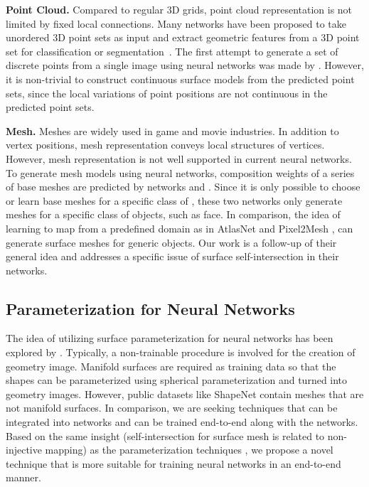 \noindent\textbf{Point Cloud.}
Compared to regular 3D grids, point cloud representation is not limited by fixed local connections.
Many networks have been proposed to take unordered 3D point sets as input and extract geometric features from a 3D point set for classification or segmentation~\cite{pointnet,NIPS2017_7095,pointcnn}.
%
The first attempt to generate a set of discrete points from a single image using neural networks was made by \cite{PSGN}. However, it is non-trivial to construct continuous surface models from the predicted point sets, since the local variations of point positions are not continuous in the predicted point sets.

\noindent\textbf{Mesh.}
Meshes are widely used in game and movie industries.
In addition to vertex positions, mesh representation conveys local structures of vertices. 
However, mesh representation is not well supported in current neural networks.
% 
To generate mesh models using neural networks, composition weights of a series of base meshes are predicted by networks \cite{img2mesh} and \cite{endface}. %
Since it is only possible to choose or learn base meshes for a specific class of , these two networks only generate meshes for a specific class of objects, such as face.
%
In comparison, the idea of learning to map from a predefined domain as in AtlasNet  \cite{atlasnet} and Pixel2Mesh \cite{pixel2mesh}, can generate surface meshes for generic objects. Our work is a follow-up of their general idea and addresses a specific issue of surface self-intersection in their networks.

\subsection{Parameterization for Neural Networks}
The idea of utilizing surface parameterization for neural networks has been explored by \cite{surfnet,geoimg}. 
Typically, a non-trainable procedure is involved for the creation of geometry image. 
Manifold surfaces are required as training data so that the shapes can be parameterized using spherical parameterization and turned into geometry images. However, public datasets like ShapeNet \cite{shapenetdata} contain meshes that are not manifold surfaces. 
In comparison, we are seeking techniques that can be integrated into networks and can be trained end-to-end along with the networks. Based on the same insight (self-intersection for surface mesh is related to non-injective mapping) as the parameterization techniques , we propose a novel technique that is more suitable for training neural networks in an end-to-end manner. 

